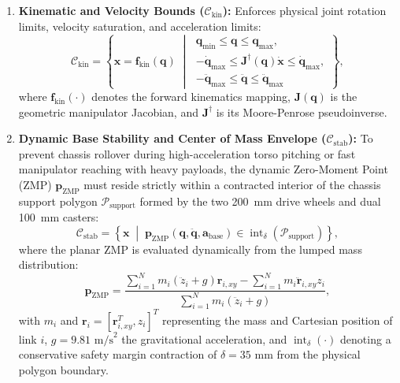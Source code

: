 \begin{enumerate}[leftmargin=1.5em]
  \item \textbf{Kinematic and Velocity Bounds ($\mathcal{C}_{\text{kin}}$):}
  Enforces physical joint rotation limits, velocity saturation, and acceleration limits:
  \begin{equation}
    \mathcal{C}_{\text{kin}} = \left\{ \mathbf{x} = \mathbf{f}_{\text{kin}}(\mathbf{q}) \;\middle|\;
    \begin{aligned}
      \mathbf{q}_{\min} \le \mathbf{q} \le \mathbf{q}_{\max}, \\
      -\dot{\mathbf{q}}_{\max} \le \mathbf{J}^{\dagger}(\mathbf{q}) \dot{\mathbf{x}} \le \dot{\mathbf{q}}_{\max}, \\
      -\ddot{\mathbf{q}}_{\max} \le \ddot{\mathbf{q}} \le \ddot{\mathbf{q}}_{\max}
    \end{aligned}
    \right\},
  \end{equation}
  where $\mathbf{f}_{\text{kin}}(\cdot)$ denotes the forward kinematics mapping, $\mathbf{J}(\mathbf{q})$ is the geometric manipulator Jacobian, and $\mathbf{J}^{\dagger}$ is its Moore-Penrose pseudoinverse.

  \item \textbf{Dynamic Base Stability and Center of Mass Envelope ($\mathcal{C}_{\text{stab}}$):}
  To prevent chassis rollover during high-acceleration torso pitching or fast manipulator reaching with heavy payloads, the dynamic Zero-Moment Point (ZMP) $\mathbf{p}_{\text{ZMP}}$ must reside strictly within a contracted interior of the chassis support polygon $\mathcal{P}_{\text{support}}$ formed by the two 200~mm drive wheels and dual 100~mm casters:
  \begin{equation}
    \mathcal{C}_{\text{stab}} = \left\{ \mathbf{x} \;\middle|\; \mathbf{p}_{\text{ZMP}}(\mathbf{q}, \ddot{\mathbf{q}}, \mathbf{a}_{\text{base}}) \in \operatorname{int}_{\delta}\left(\mathcal{P}_{\text{support}}\right) \right\},
  \end{equation}
  where the planar ZMP is evaluated dynamically from the lumped mass distribution:
  \begin{equation}
    \mathbf{p}_{\text{ZMP}} = \frac{\sum_{i=1}^{N} m_i \left(\ddot{z}_i + g\right) \mathbf{r}_{i,xy} - \sum_{i=1}^{N} m_i \ddot{\mathbf{r}}_{i,xy} z_i}{\sum_{i=1}^{N} m_i \left(\ddot{z}_i + g\right)},
  \end{equation}
  with $m_i$ and $\mathbf{r}_i = [\mathbf{r}_{i,xy}^T, z_i]^T$ representing the mass and Cartesian position of link $i$, $g = 9.81\text{ m/s}^2$ the gravitational acceleration, and $\operatorname{int}_{\delta}(\cdot)$ denoting a conservative safety margin contraction of $\delta = 35\text{ mm}$ from the physical polygon boundary.


\end{enumerate}
